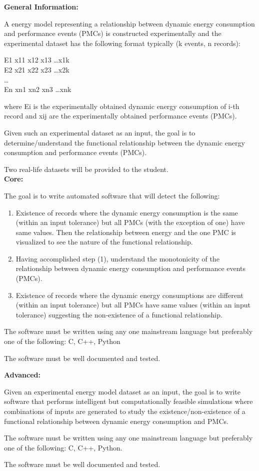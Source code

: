 \textbf{General Information:}

A energy model representing a relationship between dynamic energy consumption and performance events (PMCs) is constructed experimentally and the experimental dataset has the following format typically (k events, n records):

E1 x11 x12 x13 \ldots x1k\\
E2 x21 x22 x23 \ldots x2k\\
\ldots \\
En xn1 xn2 xn3 \ldots xnk

where Ei is the experimentally obtained dynamic energy consumption of i-th record and xij are the experimentally obtained performance events (PMCs).

Given such an experimental dataset as an input, the goal is to determine/understand the functional relationship between the dynamic energy consumption and performance events (PMCs).

Two real-life datasets will be provided to the student.\\
\textbf{Core:}

The goal is to write automated software that will detect the following:
\begin{enumerate}
    \item Existence of records where the dynamic energy consumption is the same (within an input tolerance) but all PMCs (with the exception of one) have same values. Then the relationship between energy and the one PMC is visualized to see the nature of the functional relationship.
    \item Having accomplished step (1), understand the monotonicity of the relationship between dynamic energy consumption and performance events (PMCs).
    \item Existence of records where the dynamic energy consumptions are different (within an input tolerance) but all PMCs have same values (within an input tolerance) suggesting the non-existence of a functional relationship.
\end{enumerate}

The software must be written using any one mainstream language but preferably one of the following:
C, C++, Python

The software must be well documented and tested.

\textbf{Advanced:}

Given an experimental energy model dataset as an input, the goal is to write software that performs intelligent but computationally feasible simulations where combinations of inputs are generated to study the existence/non-existence of a functional relationship between dynamic energy consumption and PMCs.

The software must be written using any one mainstream language but preferably one of the following:
C, C++, Python.

The software must be well documented and tested.